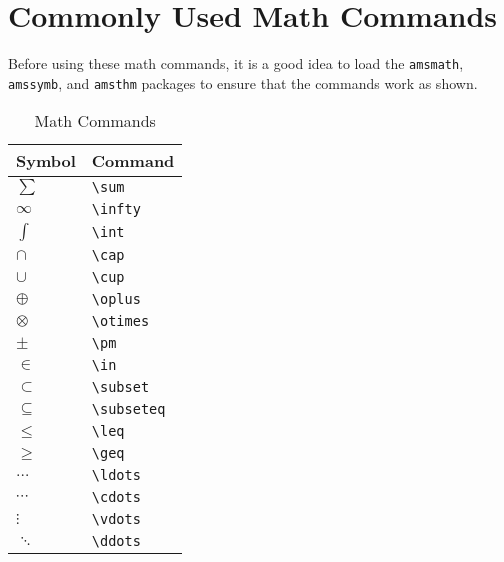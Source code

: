 \chapter{Commonly Used Math Commands}
\label{cha:commonly-used-math}

Before using these math commands, it is a good idea to load the
\texttt{amsmath}, \texttt{amssymb}, and \texttt{amsthm} packages to
ensure that the commands work as shown.

\begin{table}
  \centering
  \caption{Math Commands}
  \label{tab:math-commands}
  \begin{tabular}{@{}ll@{}}
    \toprule
    Symbol & Command \\
    \midrule
    $\sum$ & \verb|\sum| \\
    $\infty$ & \verb|\infty| \\
    $\int$ & \verb|\int| \\
    $\cap$ & \verb|\cap| \\
    $\cup$ & \verb|\cup| \\
    $\oplus$ & \verb|\oplus| \\
    $\otimes$ & \verb|\otimes| \\
    $\pm$ & \verb|\pm| \\
    $\in$ & \verb|\in| \\
    $\subset$ & \verb|\subset| \\
    $\subseteq$ & \verb|\subseteq| \\
    $\leq$ & \verb|\leq| \\
    $\geq$ & \verb|\geq| \\
    $\ldots$ & \verb|\ldots| \\
    $\cdots$ & \verb|\cdots| \\
    $\vdots$ & \verb|\vdots| \\
    $\ddots$ & \verb|\ddots| \\
    \bottomrule
  \end{tabular}  
\end{table}
